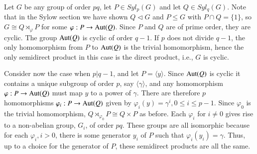 \documentclass[12pt, a4paper, oneside, openright, titlepage]{book}
\begin{document}
\begin{eg}
    Let $G$ be any group of order $pq$, let $P \in Syl_p(G)$ and let $Q \in Syl_q(G)$. Note that in the Sylow section we have shown $Q \triangleleft G$ and $P \leq G$ with $P\cap Q = \{1\}$, so $G \cong Q \rtimes_{\varphi}P$ for some $\varphi:P\rightarrow \operatorname{Aut}(Q)$. Since $P$ and $Q$ are of prime order, they are cyclic. The group $\operatorname{Aut}(Q)$ is cyclic of order $q-1$. If $p$ does not divide $q-1$, the only homomorphism from $P$ to $\operatorname{Aut}(Q)$ is the trivial homomorphism, hence the only semidirect product in this case is the direct product, i.e., $G$ is cyclic.

    Consider now the case when $p \vert q- 1$, and let $P = \langle y \rangle$. Since $\operatorname{Aut}(Q)$ is cyclic it contains a unique subgroup of order $p$, say $\langle \gamma \rangle$, and any homomorphism $\varphi:P\rightarrow \operatorname{Aut}(Q)$ must map $y$ to a power of $\gamma$. There are therefore $p$ homomorphisms $\varphi_i:P\rightarrow \operatorname{Aut}(Q)$ given by $\varphi_i(y) = \gamma^i, 0 \leq i \leq p -1$. Since $\varphi_0$ is the trivial homomorphism, $Q \rtimes_{\varphi_0}P \cong Q\times P$ as before. Each $\varphi_i$ for $i\neq 0$ gives rise to a non-abelian group, $G_i$, of order $pq$. These groups are all isomorphic because for each $\varphi_i, i > 0$, there is some generator $y_i$ of $P$ such that $\varphi_i(y_i) = \gamma$. Thus, up to a choice for the generator of $P$, these semidirect products are all the same.
\end{eg}
\end{document}
